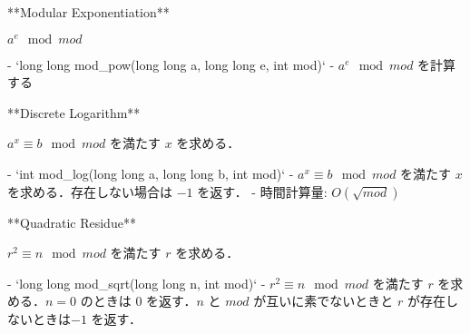 \begin{small}
\begin{markdown}
**Modular Exponentiation**

$a^e \mod mod$

- `long long mod\_pow(long long a, long long e, int mod)`
    - $a^e \mod mod$ を計算する

**Discrete Logarithm**

$a^x \equiv b \mod mod$ を満たす $x$ を求める．

- `int mod\_log(long long a, long long b, int mod)`
    - $a^x \equiv b \mod mod$ を満たす $x$ を求める．存在しない場合は $-1$ を返す．
    - 時間計算量: $O(\sqrt{mod})$

**Quadratic Residue**

$r^2 \equiv n \mod mod$ を満たす $r$ を求める．

- `long long mod\_sqrt(long long n, int mod)`
    - $r^2 \equiv n \mod mod$ を満たす $r$ を求める．$n = 0$ のときは $0$ を返す．$n$ と $mod$ が互いに素でないときと $r$ が存在しないときは$-1$ を返す．
\end{markdown}
\end{small}

